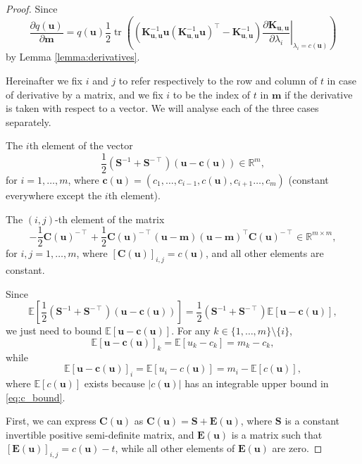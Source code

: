 \documentclass{article}
\theoremstyle{definition}
\theoremstyle{remark}
\DeclareMathOperator{\tr}{tr}
\newcommand{\Kuu}{\mathbf{K}_{\mathbf{u},\mathbf{u}}}
\begin{document}
\begin{proof}
  Since
  \[
    \frac{\partial q(\mathbf{u})}{\partial \mathbf{m}} = q(\mathbf{u})
    \frac{1}{2}\tr \left((\Kuu^{-1}\mathbf{u}(\Kuu^{-1}\mathbf{u})^\intercal -
      \Kuu^{-1}) \left. \frac{\partial \Kuu}{\partial \lambda_i}
      \right|_{\lambda_i = c(\mathbf{u})} \right)
  \]
  by Lemma \ref{lemma:derivatives}.

  Hereinafter we fix $i$ and $j$ to refer respectively to the row and
  column of $t$ in case of derivative by a matrix, and we fix $i$ to be the
  index of $t$ in $\mathbf{m}$ if the derivative is taken with respect to a
  vector. We will analyse each of the three cases separately.

  The $i$th element of the vector
    \[
      \frac{1}{2}(\mathbf{S}^{-1} + \mathbf{S}^{-\intercal})(\mathbf{u} -
      \mathbf{c}(\mathbf{u})) \in \mathbb{R}^m,
    \]
    for $i = 1, \dots, m$, where $\mathbf{c}(\mathbf{u}) = (c_1, \dots, c_{i -
      1}, c(\mathbf{u}), c_{i + 1} \dots, c_m)$ (constant everywhere except the
    $i$th element).

    The $(i,j)$-th element of the matrix
    \[
      -\frac{1}{2}\mathbf{C}(\mathbf{u})^{-\intercal} +
      \frac{1}{2}\mathbf{C}(\mathbf{u})^{-\intercal}(\mathbf{u} -
      \mathbf{m})(\mathbf{u} -
      \mathbf{m})^\intercal\mathbf{C}(\mathbf{u})^{-\intercal} \in \mathbb{R}^{m
        \times m},
    \]
    for $i, j = 1, \dots, m$, where $[\mathbf{C}(\mathbf{u})]_{i,j} =
    c(\mathbf{u})$, and all other elements are constant.

    Since
    \[
      \mathbb{E} \left[ \frac{1}{2}(\mathbf{S}^{-1} +
        \mathbf{S}^{-\intercal})(\mathbf{u} - \mathbf{c}(\mathbf{u})) \right] =
      \frac{1}{2}(\mathbf{S}^{-1} + \mathbf{S}^{-\intercal})
      \mathbb{E}[\mathbf{u} - \mathbf{c}(\mathbf{u})],
    \]
    we just need to bound $\mathbb{E}[\mathbf{u} - \mathbf{c}(\mathbf{u})]$. For
    any $k \in \{ 1, \dots, m \} \setminus \{ i \}$,
    \[
      \mathbb{E}[\mathbf{u} - \mathbf{c}(\mathbf{u})]_k = \mathbb{E}[u_k - c_k]
      = m_k - c_k,
    \]
    while
    \[
      \mathbb{E}[\mathbf{u} - \mathbf{c}(\mathbf{u})]_i = \mathbb{E}[u_i
      - c(\mathbf{u})] = m_i - \mathbb{E}[c(\mathbf{u})],
    \]
    where $\mathbb{E}[c(\mathbf{u})]$ exists because $|c(\mathbf{u})|$ has an
    integrable upper bound in \eqref{eq:c_bound}.

    First, we can express $\mathbf{C}(\mathbf{u})$ as
    $\mathbf{C}(\mathbf{u}) = \mathbf{S} + \mathbf{E}(\mathbf{u})$, where
    $\mathbf{S}$ is a constant invertible positive semi-definite matrix, and
    $\mathbf{E}(\mathbf{u})$ is a matrix such that
    $[\mathbf{E}(\mathbf{u})]_{i,j} = c(\mathbf{u}) - t$, while all other
    elements of $\mathbf{E}(\mathbf{u})$ are zero.


\end{proof}
\end{document}

